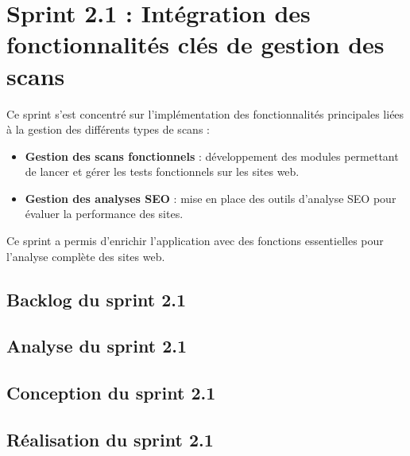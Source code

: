 \section{Sprint 2.1 : Intégration des fonctionnalités clés de gestion des scans}
Ce sprint s’est concentré sur l’implémentation des fonctionnalités principales liées à la gestion des différents types de scans :
\begin{itemize}[label=$-$]
    \item \textbf{Gestion des scans fonctionnels} : développement des modules permettant de lancer et gérer les tests fonctionnels sur les sites web.
    \item \textbf{Gestion des analyses SEO} : mise en place des outils d’analyse SEO pour évaluer la performance des sites.
\end{itemize}
Ce sprint a permis d’enrichir l’application avec des fonctions essentielles pour l’analyse complète des sites web.

\subsection{Backlog du sprint 2.1}  


\subsection{Analyse du sprint 2.1}


\subsection{Conception du sprint 2.1}


\subsection{Réalisation du sprint 2.1}

